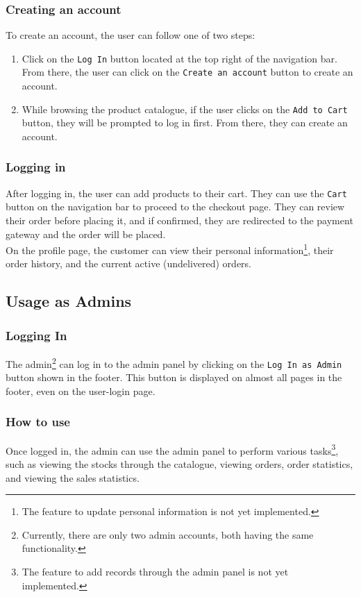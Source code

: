 \documentclass[12pt]{report}
\begin{document}
    \subsubsection*{Creating an account}
    To create an account, the user can follow one of two steps:
    \begin{enumerate}
        \item
        Click on the \texttt{Log In} button located at the top right of the navigation bar.
        From there, the user can click on the \texttt{Create an account} button to create an account.
        \item
        While browsing the product catalogue, if the user clicks on the \texttt{Add to Cart} button, they will be prompted to log in first.
        From there, they can create an account.
    \end{enumerate}

    \subsubsection*{Logging in}
    After logging in, the user can add products to their cart.
    They can use the \texttt{Cart} button on the navigation bar to proceed to the checkout page.
    They can review their order before placing it, and if confirmed, they are redirected to the payment gateway and the order will be placed.
    \vspace*{10pt} \\
    On the profile page, the customer can view their personal information\footnote{
        The feature to update personal information is not yet implemented.
    }, their order history, and the current active (undelivered) orders.

    \subsection*{Usage as Admins}
    \subsubsection*{Logging In}
    The admin\footnote{
        Currently, there are only two admin accounts, both having the same functionality.
    } can log in to the admin panel by clicking on the \texttt{Log In as Admin} button shown in the footer.
    This button is displayed on almost all pages in the footer, even on the user-login page.

    \subsubsection*{How to use}
    Once logged in, the admin can use the admin panel to perform various tasks\footnote{
        The feature to add records through the admin panel is not yet implemented.
    }, such as viewing the stocks through the catalogue, viewing orders, order statistics,
    and viewing the sales statistics.
\end{document}
